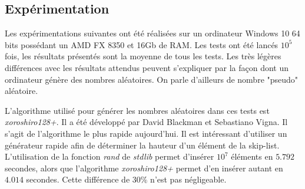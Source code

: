 \documentclass[hidelinks,a4paper, 12pt]{article}
\begin{document}
	 	
	 
	
	\newpage
	\subsection{Expérimentation}
	
	Les expérimentations suivantes ont été réalisées sur un ordinateur Windows 10 64 bits possédant un AMD FX 8350 et 16Gb de RAM. Les tests ont été lancés $10^5$ fois, les résultats présentés sont la moyenne de tous les tests. Les très légères différences avec les résultats attendus peuvent s'expliquer par la façon dont un ordinateur génère des nombres aléatoires. On parle d'ailleurs de nombre "pseudo" aléatoire.
	
	L'algorithme utilisé pour générer les nombres aléatoires dans ces tests est \textit{xoroshiro128+}. Il a été développé par David Blackman et Sebastiano Vigna. Il s'agit de l'algorithme le plus rapide aujourd'hui. Il est intéressant d'utiliser un générateur rapide afin de déterminer la hauteur d'un élément de la skip-list. L'utilisation de la fonction \textit{rand} de \textit{stdlib} permet d'insérer $10^7$ éléments en $5.792$ secondes, alors que l'algorithme \textit{xoroshiro128+} permet d'en insérer autant en $4.014$ secondes. Cette différence de $30\%$ n'est pas négligeable.
	
\end{document}
